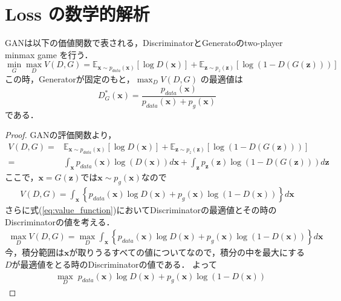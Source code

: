 \documentclass[uplatex]{jsarticle}
\begin{document}
    \section{Loss の数学的解析}
    GANは以下の価値関数で表される，DiscriminatorとGeneratoのtwo-player minmax game を行う．
    \begin{equation}
        \min_G \max_D V(D, G) = \mathbb{E}_{\bm{x}\sim p_{data}(\bm{x})}\left[\log D(\bm{x})\right] + \mathbb{E}_{\bm{z} \sim {p_{z}(\bm{z})}}\left[\log{\left(1-D\left(G \left(\bm{z}\right) \right) \right)}\right]
    \end{equation}
    この時，Generatorが固定のもと，$\max_D V(D, G)$ の最適値は
    \[ D^{\ast}_{G} (\bm{x})  = \frac{p_{data}(\bm{x})}{p_{data}(\bm{x}) + p_{g}(\bm{x})} \]
    である．
    \begin{proof}
        GANの評価関数より，
        \begin{align}
            V (D, G) =& \mathbb{E}_{\bm{x}\sim p_{data}(\bm{x})}\left[\log D(\bm{x})\right] + \mathbb{E}_{\bm{z} \sim {p_{z}(\bm{z})}}\left[\log{\left(1-D\left(G \left(\bm{z}\right) \right) \right)}\right] \\
                =& \int_{\bm{x}} p_{data} (\bm{x}) \log \left( D(\bm{x}) \right) d \bm{x}
                + \int_{\bm{z}} p_{\bm{z}} (\bm{z}) \log \left( 1-D \left( G(\bm{z}) \right) \right) d\bm{z} \label{eq:expected_value_function}
        \end{align}
        ここで，$\bm{x} = G(\bm{z})$では$\bm{x} \sim p_g(\bm{x})$なので
        \begin{align}
            V (D, G)  = \int_{\bm{x}} \left\{ p_{data} (\bm{x}) \log D(\bm{x})
                        +  p_{g} (\bm{x}) \log \left( 1-D \left( \bm{x} \right) \right) \right\} d\bm{x} \label{eq:value_function}
        \end{align}
        さらに式(\ref{eq:value_function})においてDiscriminatorの最適値とその時のDiscriminatorの値を考える．
        \begin{align}
            \max_D V(D, G) = \max_D \int_{\bm{x}} \left\{ p_{data} (\bm{x}) \log D(\bm{x})
            +  p_{g} (\bm{x}) \log \left( 1-D \left( \bm{x} \right) \right) \right\} d\bm{x} \label{eq:optimal_d}
        \end{align}
        今，積分範囲は$\bm{x}$が取りうるすべての値についてなので，積分の中を最大にする$D$が最適値をとる時のDiscriminatorの値である．
        よって
        \begin{align}
            &\max_D \; p_{data} (\bm{x}) \log D(\bm{x})
            +  p_{g} (\bm{x}) \log \left( 1-D \left( \bm{x} \right) \right) 

\end{align}
\end{proof}
\end{document}
